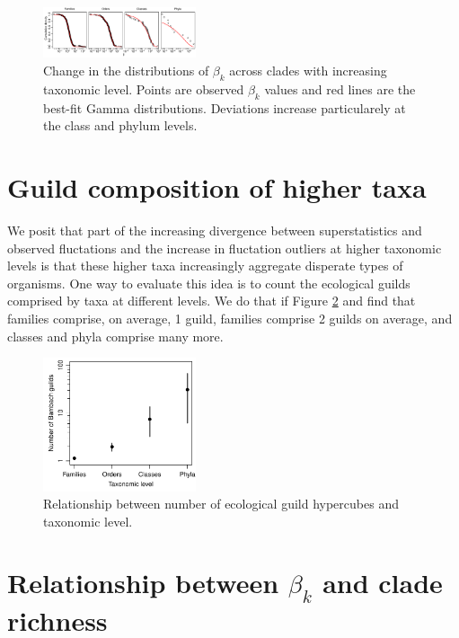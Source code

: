 \documentclass[12pt]{article}
\begin{document}
\begin{figure}[!hp]
  \centering
  \includegraphics[width=0.4\textwidth]{../../figSupp_fbeta_allTaxa.pdf}
  \caption{Change in the distributions of $\beta_k$ across clades with
    increasing taxonomic level. Points are observed $\beta_k$ values
    and red lines are the best-fit Gamma distributions. Deviations
    increase particularely at the class and phylum levels.}
  \label{figSupp:fbeta_allTaxa}
\end{figure}


\section{Guild composition of higher taxa}
\label{sec:suppGuilds} 

We posit that part of the increasing divergence between
superstatistics and observed fluctations and the increase in
fluctation outliers at higher taxonomic levels is that these higher
taxa increasingly aggregate disperate types of organisms. One way to
evaluate this idea is to count the ecological guilds comprised by taxa
at different levels. We do that if Figure \ref{figSupp:eeSpaceOcc} and
find that families comprise, on average, 1 guild, families comprise 2
guilds on average, and classes and phyla comprise many more.

\begin{figure}[!hp]
  \centering
  \includegraphics[width=0.4\textwidth]{../../figSupp_eeSpaceOcc.pdf} 
  \caption{Relationship between number of ecological guild hypercubes
    and taxonomic level.}
  \label{figSupp:eeSpaceOcc}
\end{figure}


\section{Relationship between $\beta_k$ and clade richness}
\label{sec:suppBetaRichness} 
\end{document}
